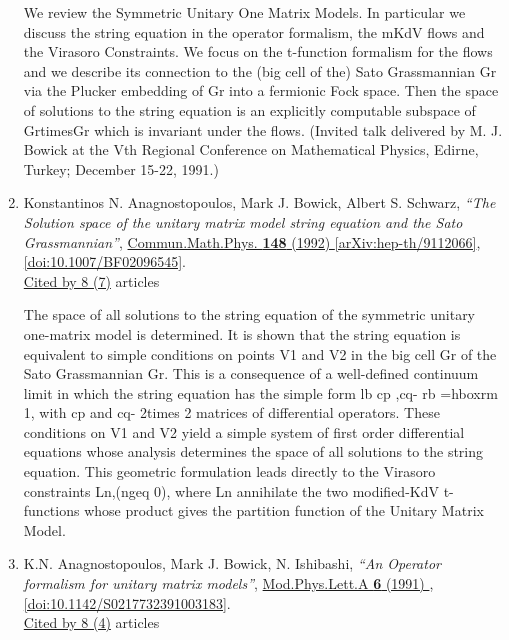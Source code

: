 \documentclass[a4paper,10pt]{article}
\begin{document}
\begin{enumerate}
We review the Symmetric Unitary One Matrix Models. In particular we discuss the string equation in the operator formalism, the mKdV flows and the Virasoro Constraints. We focus on the t-function formalism for the flows and we describe its connection to the (big cell of the) Sato Grassmannian Gr via the Plucker embedding of Gr into a fermionic Fock space. Then the space of solutions to the string equation is an explicitly computable subspace of GrtimesGr which is invariant under the flows. (Invited talk delivered by M. J. Bowick at the Vth Regional Conference on Mathematical Physics, Edirne, Turkey; December 15-22, 1991.)
\item Konstantinos N. Anagnostopoulos, Mark J. Bowick, Albert S. Schwarz, {\it ``The Solution space of the unitary matrix model string equation and the Sato Grassmannian''}, \href{https://www.doi.org/10.1007/BF02096545}{Commun.Math.Phys. {\bf 148} (1992) } \href{https://arxiv.org/abs/hep-th/9112066}{[arXiv:hep-th/9112066]}, \href{https://www.doi.org/10.1007/BF02096545}{[doi:10.1007/BF02096545]}.
\\\href{https://inspirehep.net/literature/?q=refersto%3Arecid%3A322308}{Cited by 8 (7)} articles

The space of all solutions to the string equation of the symmetric unitary one-matrix model is determined. It is shown that the string equation is equivalent to simple conditions on points V1 and V2 in the big cell Gr of the Sato Grassmannian Gr. This is a consequence of a well-defined continuum limit in which the string equation has the simple form lb cp ,cq- rb =hbox{rm 1}, with cp and cq- 2times 2 matrices of differential operators. These conditions on V1 and V2 yield a simple system of first order differential equations whose analysis determines the space of all solutions to the string equation. This geometric formulation leads directly to the Virasoro constraints Ln,(ngeq 0), where Ln annihilate the two modified-KdV t-functions whose product gives the partition function of the Unitary Matrix Model.
\item K.N. Anagnostopoulos, Mark J. Bowick, N. Ishibashi, {\it ``An Operator formalism for unitary matrix models''}, \href{https://www.doi.org/10.1142/S0217732391003183}{Mod.Phys.Lett.A {\bf 6} (1991) }, \href{https://www.doi.org/10.1142/S0217732391003183}{[doi:10.1142/S0217732391003183]}.
\\\href{https://inspirehep.net/literature/?q=refersto%3Arecid%3A317536}{Cited by 8 (4)} articles


\end{enumerate}
\end{document}
